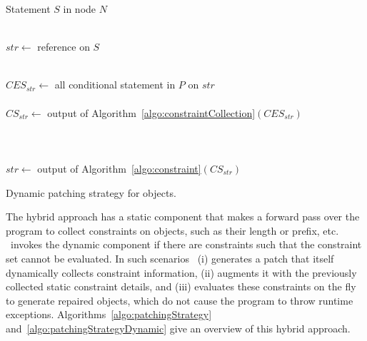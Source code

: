 \begin{algorithm}[t]
\scriptsize
\DontPrintSemicolon
{}
\Begin
{
  {
  Statement $S$ in node $N$\\
   {\\
  	\mytab $str \longleftarrow$  reference on $S$
  	
  	 {\\
          \mytab $CES_{str} \longleftarrow$ all conditional statement in $P$ on
$str$\\
 
 \mytab  {}\\
  	  \mytab $CS_{str} \longleftarrow$ output of
Algorithm~\ref{algo:constraintCollection}$(CES_{str})$\\

  		\mytab {} {\\
  		
  		\mytab \mytab {} {\\

\mytab\mytab {}\\
                        \mytab \mytab \mytab $str \longleftarrow$ output of
Algorithm~\ref{algo:constraint}$(CS_{str})$
  		} \mytab \mytab {}
  		}
		\vspace{-4em} 
    }
  }
 }
}

\caption{Dynamic patching strategy for  objects.}
\label{algo:patchingStrategyDynamic}
\end{algorithm}
The hybrid approach has a static component that makes a forward pass over the
program to collect constraints on  objects, such as their
length or prefix, etc. \tool\ invokes the dynamic component if there are constraints
such that the constraint set cannot be evaluated. In
such scenarios \tool\ (i) generates a patch that itself dynamically collects
constraint information, (ii) augments it with the previously collected static
constraint details, and (iii) evaluates these constraints on the fly to generate
repaired  objects, which do not cause the program to throw runtime
exceptions. Algorithms~\ref{algo:patchingStrategy}
and~\ref{algo:patchingStrategyDynamic} give an overview of this
hybrid approach.

